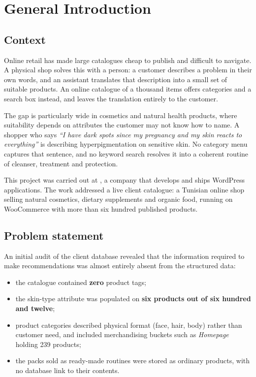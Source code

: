 ﻿%
\clearpage
{}
{}
\chapter*{General Introduction}

\section*{Context}

Online retail has made large catalogues cheap to publish and difficult to
navigate. A physical shop solves this with a person: a customer describes a
problem in their own words, and an assistant translates that description into
a small set of suitable products. An online catalogue of a thousand items
offers categories and a search box instead, and leaves the translation entirely
to the customer.

The gap is particularly wide in cosmetics and natural health products, where
suitability depends on attributes the customer may not know how to name.
A shopper who says \emph{``I have dark spots since my pregnancy and my skin
reacts to everything''} is describing hyperpigmentation on sensitive skin. No
category menu captures that sentence, and no keyword search resolves it into a
coherent routine of cleanser, treatment and protection.

This project was carried out at \companyname, a company that develops and
ships WordPress applications. The work addressed a live client catalogue: a
Tunisian online shop selling natural cosmetics, dietary supplements and organic
food, running on WooCommerce with more than six hundred published products.

\section*{Problem statement}

An initial audit of the client database revealed that the information required
to make recommendations was almost entirely absent from the structured data:

\begin{itemize}
  \item the catalogue contained \textbf{zero} product tags;
  \item the skin-type attribute was populated on \textbf{six products out of
        six hundred and twelve};
  \item product categories described physical format (face, hair, body) rather
        than customer need, and included merchandising buckets such as
        \emph{Homepage} holding 239 products;
  \item the packs sold as ready-made routines were stored as ordinary products,
        with no database link to their contents.
\end{itemize}

